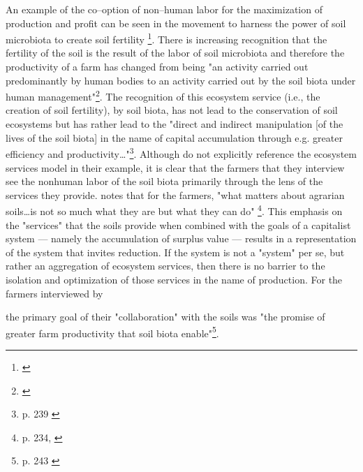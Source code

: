 \documentclass{article}
\begin{document}
An example of the co--option of non--human labor for the maximization of production and profit can be seen in the movement to harness the power of soil microbiota to create soil fertility \footnote{\cite{krz_nonhuman_2020}}. There is increasing recognition that the fertility of the soil is the result of the labor of soil microbiota and therefore the productivity of a farm has changed from being "an activity carried out predominantly by human bodies to an activity carried out by the soil biota under human management"\footnote{\cite{krz_nonhuman_2020}}. The recognition of this ecosystem service (i.e., the creation of soil fertility), by soil biota, has not lead to the conservation of soil ecosystems but has rather lead to the "direct and indirect manipulation [of the lives of the soil biota] in the name of capital accumulation through e.g. greater efficiency and productivity\ldots"\footnote{p. 239 \cite{krz_nonhuman_2020}}. Although \citet{krz_nonhuman_2020} do not explicitly reference the ecosystem services model in their example, it is clear that the farmers that they interview see the nonhuman labor of the soil biota primarily through the lens of the services they provide. \citet{krz_nonhuman_2020} notes that for the farmers, "what matters about agrarian soils\ldots is not so much what they are but what they can do" \footnote{p. 234, \cite{krz_nonhuman_2020}}. This emphasis on the "services" that the soils provide when combined with the goals of a capitalist system --- namely the accumulation of surplus value --- results in a representation of the system that invites reduction. If the system is not a "system" per se, but rather an aggregation of ecosystem services, then there is no barrier to the isolation and optimization of those services in the name of production. For the farmers interviewed by {\citet{krz_nonhuman_2020} the primary goal of their "collaboration" with the soils was "the promise of greater farm productivity that soil biota enable"\footnote{p. 243 \cite{krz_nonhuman_2020}}.

}
\end{document}
